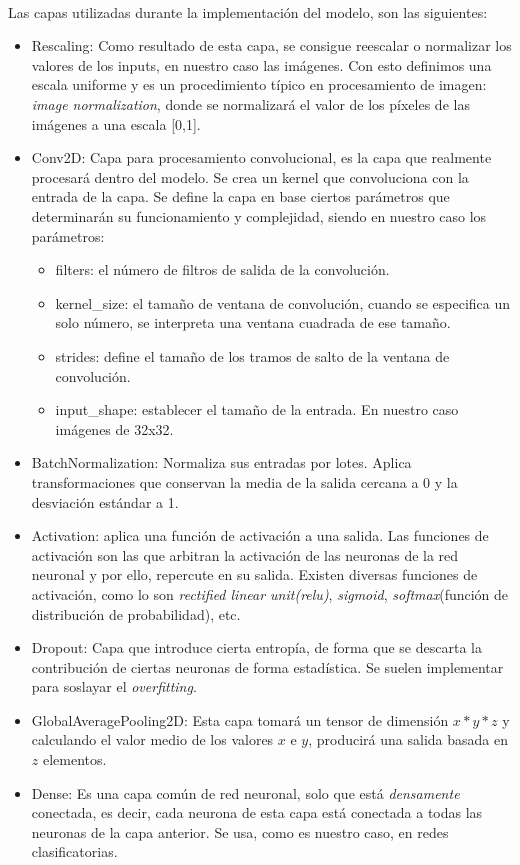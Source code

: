 \begin{appendices}
Las capas utilizadas durante la implementación del modelo,
son las siguientes\textsuperscript{\cite{keras}}:
\begin{itemize}
    \itemsep0em 
    \item Rescaling: Como resultado de esta capa,
    se consigue reescalar o normalizar
    los valores de los inputs, en nuestro caso las imágenes. Con esto definimos
    una escala uniforme y es un procedimiento típico en procesamiento de imagen:
    \textit{image normalization}, donde se normalizará el valor de los píxeles
    de las imágenes a una escala [0,1].
    \item Conv2D: Capa para procesamiento convolucional,
    es la capa que realmente
    procesará dentro del modelo. Se crea un kernel que convoluciona con la entrada
    de la capa. Se define la capa en base ciertos parámetros que determinarán su
    funcionamiento y complejidad, siendo en nuestro caso los parámetros:
    \begin{itemize}
        \itemsep0em 
        \item filters: el número de filtros de salida de la convolución.
        \item kernel\_size: el tamaño de ventana de convolución, cuando se
        especifica un solo número, se interpreta una ventana cuadrada de ese
        tamaño.
        \item strides: define el tamaño de los tramos de salto de la ventana
        de convolución.
        \item input\_shape: establecer el tamaño de la entrada. En nuestro caso
        imágenes de 32x32.
    \end{itemize}
    \item BatchNormalization: Normaliza sus entradas por lotes.
    Aplica transformaciones
    que conservan la media de la salida cercana a 0 y la desviación estándar a 1.
    \item Activation: aplica una función de activación a una salida. Las funciones de
    activación son las que arbitran la activación de las neuronas de la red neuronal
    y por ello, repercute en su salida. Existen diversas
    funciones de activación, como lo son \textit{rectified linear unit(relu)},
    \textit{sigmoid}, \textit{softmax}(función de distribución de probabilidad), etc.
    \item Dropout: Capa que introduce cierta entropía, de forma que se descarta
    la contribución de ciertas neuronas de forma estadística. Se suelen implementar
    para soslayar el \textit{overfitting}.
    \item GlobalAveragePooling2D: Esta capa tomará un
    tensor de dimensión $x*y*z$ y
    calculando el valor medio de los valores $x$ e $y$, producirá una salida basada en
    $z$ elementos.
    \item Dense: Es una capa común de red neuronal,
    solo que está \textit{densamente}
    conectada, es decir, cada neurona de esta capa está conectada a todas las neuronas
    de la capa anterior. Se usa, como es nuestro caso, en redes clasificatorias.
\end{itemize}


\end{appendices}
